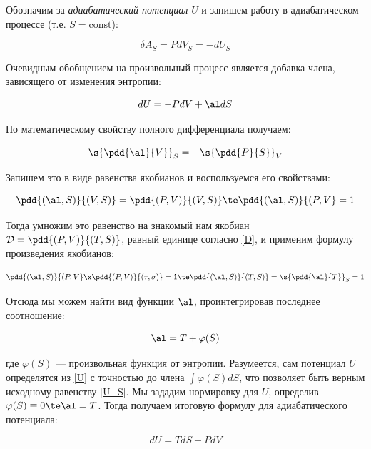\documentclass[12pt]{kiarticle}
\newcommand{\del}{\ensuremath{\delta}}
\newcommand{\co}{\ensuremath{\mathrm{const}}}
\newcommand{\D}{\ensuremath{\mathcal{D}}}
\begin{document}
Обозначим за \textit{адиабатический потенциал} $ U $ и запишем работу в адиабатическом процессе (т.е. $ S = \co $):

\begin{equation}\label{U_S}
\del A_S = P dV_S = - dU_S
\end{equation}

Очевидным обобщением на произвольный процесс является добавка члена, зависящего от изменения энтропии:

\begin{equation}\label{U}
dU = - PdV + \al dS
\end{equation}

По математическому свойству полного дифференциала получаем:

\begin{equation}\label{}
\s{\pdd{\al}{V}}_S = - \s{\pdd{P}{S}}_V
\end{equation}

Запишем это в виде равенства якобианов и воспользуемся его свойствами:

\begin{equation}\label{}
\pdd{(\al, S)}{(V, S)} = \pdd{(P, V)}{(V, S)} \te \pdd{(\al, S)}{(P, V} = 1
\end{equation}

Тогда умножим это равенство на знакомый нам якобиан $ \D  = \pdd{(P, V)}{(T, S)} $, равный единице согласно \eqref{D}, и применим формулу произведения якобианов:

\begin{equation}\label{}
\pdd{(\al, S)}{(P, V} \x  \pdd{(P, V)}{(\tau, \sigma)} = 1 \te \pdd{(\al, S)}{(T, S)} = \s{\pdd{\al}{T}}_S = 1
\end{equation}

Отсюда мы можем найти вид функции $ \al $, проинтегрировав последнее соотношение:

\begin{equation}\label{}
\al = T + \varphi(S)
\end{equation}

где $ \varphi(S) $ --- произвольная функция от энтропии. Разумеется, сам потенциал $ U $ определятся из \eqref{U} с точностью до члена $ \int \varphi(S)dS $, что позволяет быть верным исходному равенству \eqref{U_S}. Мы зададим нормировку для $ U $, определив $ \varphi(S) \equiv 0 \te \al = T $. Тогда получаем итоговую формулу для адиабатического потенциала:

\begin{equation}\label{U =}
dU = TdS - PdV
\end{equation}
\end{document}

